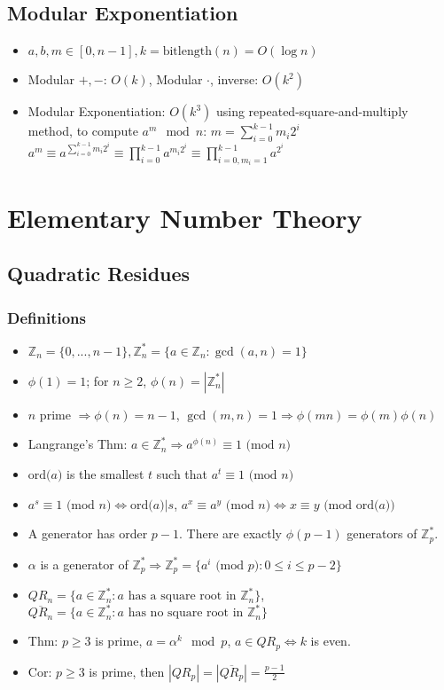\documentclass[12pt]{article}
\newcommand{\Z}{\mathbb{Z}}
\newcommand{\I}{\Rightarrow}
\newcommand{\modd}[1]{\text{ (mod } #1\text{)}}
\newcommand{\ord}[1]{\text{ord(} #1\text{)}}
\begin{document}
\subsection{Modular Exponentiation}

\begin{itemize}
\item $a,b,m \in [0, n-1], k = \text{bitlength}(n) = O(\log n)$
\item Modular $+,-$: $O(k)$, Modular $\cdot$, inverse: $O(k^2)$
\item Modular Exponentiation: $O(k^3)$ using repeated-square-and-multiply method, to compute $a^m \mod n$:
\subitem $m = \sum_{i = 0}^{k-1} m_i2^i$
\subitem $a^m \equiv a^{\sum_{i=0}^{k-1} m_i2^i} \equiv \prod_{i=0}^{k-1} a^{m_i2^i} \equiv \prod_{i = 0, m_i=1}^{k-1} a^{2^i}$
\end{itemize}

\section{Elementary Number Theory}
\subsection{Quadratic Residues}
\subsubsection{Definitions}

\begin{itemize}
\item $\Z_n = \{0,...,n-1\}, \Z_n^* = \{a \in \Z_n : \gcd(a,n)=1 \}$
\item $\phi(1) = 1$; for $n \ge 2$, $\phi(n) = |\Z_n^*|$
\item $n$ prime $\I \phi(n) = n-1$, $\gcd(m,n) = 1 \I \phi(mn) = \phi(m)\phi(n)$
\item Langrange's Thm: $a \in \Z_n^* \I a^{\phi(n)} \equiv 1 \modd n$
\item $\ord{a}$ is the smallest $t$ such that $a^t \equiv 1 \modd n$
\item $a^s \equiv 1 \modd n \iff \ord{a}|s$, $a^x \equiv a^y \modd n \iff x \equiv y \modd{\ord{a}}$
\item A generator has order $p-1$. There are exactly $\phi(p-1)$ generators of $\Z_p^*$.
\item $\alpha$ is a generator of $\Z_p^* \I \Z_p^* = \{a^i \modd p: 0 \le i \le p-2\}$
\item $QR_n = \{a \in \Z_n^*: a \text{ has a square root in } \Z_n^* \}$, $\overline{QR_n} = \{a \in \Z_n^*: a \text{ has no square root in } \Z_n^* \}$
\item Thm: $p \ge 3$ is prime, $a = \alpha^k \mod p$, $a \in QR_p \iff k$ is even.
\item Cor: $p \ge 3$ is prime, then $|QR_p| = |\overline{QR_p}| = \frac{p-1}{2}$
\end{itemize}
\end{document}
